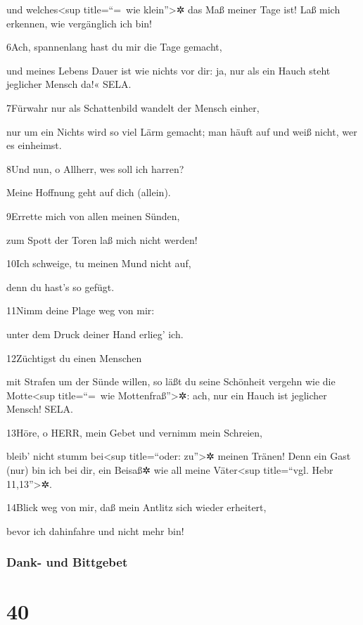 und welches\textless sup title=``=~wie klein''\textgreater✲ das Maß
meiner Tage ist! Laß mich erkennen, wie vergänglich ich bin!

6Ach, spannenlang hast du mir die Tage gemacht,

und meines Lebens Dauer ist wie nichts vor dir: ja, nur als ein Hauch
steht jeglicher Mensch da!« SELA.

7Fürwahr nur als Schattenbild wandelt der Mensch einher,

nur um ein Nichts wird so viel Lärm gemacht; man häuft auf und weiß
nicht, wer es einheimst.

8Und nun, o Allherr, wes soll ich harren?

Meine Hoffnung geht auf dich (allein).

9Errette mich von allen meinen Sünden,

zum Spott der Toren laß mich nicht werden!

10Ich schweige, tu meinen Mund nicht auf,

denn du hast's so gefügt.

11Nimm deine Plage weg von mir:

unter dem Druck deiner Hand erlieg' ich.

12Züchtigst du einen Menschen

mit Strafen um der Sünde willen, so läßt du seine Schönheit vergehn wie
die Motte\textless sup title=``=~wie Mottenfraß''\textgreater✲: ach, nur
ein Hauch ist jeglicher Mensch! SELA.

13Höre, o HERR, mein Gebet und vernimm mein Schreien,

bleib' nicht stumm bei\textless sup title=``oder: zu''\textgreater✲
meinen Tränen! Denn ein Gast (nur) bin ich bei dir, ein Beisaß✲ wie all
meine Väter\textless sup title=``vgl. Hebr 11,13''\textgreater✲.

14Blick weg von mir, daß mein Antlitz sich wieder erheitert,

bevor ich dahinfahre und nicht mehr bin!

\hypertarget{dank--und-bittgebet}{%
\subsubsection{Dank- und Bittgebet}\label{dank--und-bittgebet}}

\hypertarget{section-39}{%
\section{40}\label{section-39}}

